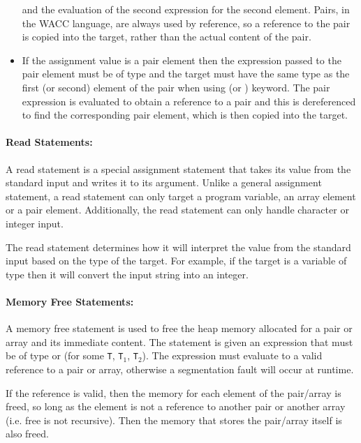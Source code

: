 \documentclass[a4paper]{article}
\theoremstyle{definition}
\begin{document}
\begin{itemize}
       and the evaluation of the second expression for the second element.
       Pairs, in the WACC language, are always used by reference, so a reference to the pair is copied into the target, rather than the actual content of the pair.
 \item If the assignment value is a pair element  then the expression passed to the pair element must be of type 
       and the target must have the same type as the first (or second) element of the pair when using  (or ) keyword.
       The pair expression is evaluated to obtain a reference to a pair and this is dereferenced to find the corresponding pair element,
       which is then copied into the target.
 \end{itemize}

\paragraph{Read Statements:}
A read statement  is a special assignment statement that takes its value from the standard input and writes it to its argument.
Unlike a general assignment statement, a read statement can only target a program variable, an array element or a pair element.
Additionally, the read statement can only handle character or integer input.

The read statement determines how it will interpret the value from the standard input based on the type of the target.
For example, if the target is a variable of type  then it will convert the input string into an integer.


\paragraph{Memory Free Statements:}
A memory free statement  is used to free the heap memory allocated for a pair or array and its immediate content.
The statement is given an expression that must be of type  or  (for some {\tt T}, {\tt T}$_1$, {\tt T}$_2$).
The expression must evaluate to a valid reference to a pair or array, otherwise a segmentation fault will occur at runtime.

If the reference is valid, then the memory for each element of the pair/array is freed, so long as the element is not a reference to another pair or another array
(i.e. free is not recursive).
Then the memory that stores the pair/array itself is also freed.
\end{document}
